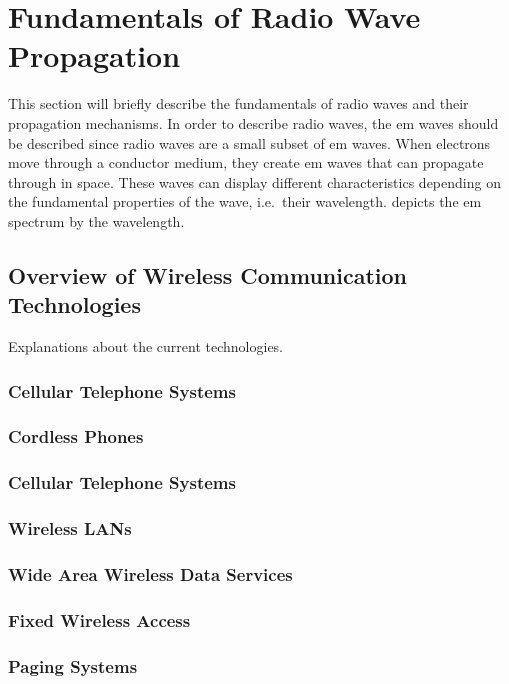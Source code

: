 \section{Fundamentals of Radio Wave Propagation}
\label{sec:fundradioprop}
This section will briefly describe the fundamentals of radio waves and their propagation mechanisms.
In order to describe radio waves, the \gls{em} waves should be described since radio waves are a small subset of \gls{em} waves.
When electrons move through a conductor medium, they create \gls{em}  waves that can propagate through in space.
These waves can display different characteristics depending on the fundamental properties of the wave,  i.e.\ their wavelength.
 depicts the \gls{em} spectrum by the wavelength.

\subsection{Overview of Wireless Communication Technologies}
Explanations about the current technologies.
\subsubsection{Cellular Telephone Systems}
\subsubsection{Cordless Phones}
\subsubsection{Cellular Telephone Systems}
\subsubsection{Wireless LANs}
\subsubsection{Wide Area Wireless Data Services}
\subsubsection{Fixed Wireless Access}
\subsubsection{Paging Systems}
